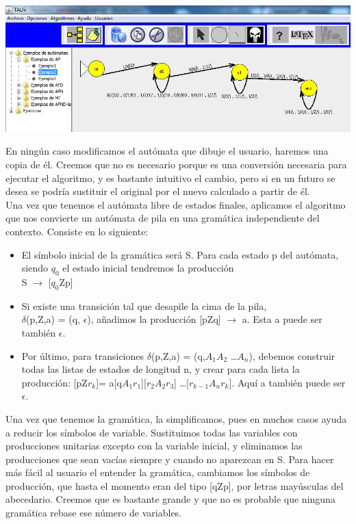 \documentclass[12pt,a4paper,spanish]{book}
\begin{document}
\begin{center}
\includegraphics[width=\textwidth]{roci1.jpg}
\end{center}

En ning\'un caso modificamos el aut\'omata que dibuje el usuario, haremos una copia de \'el. Creemos que no es necesario porque es una conversi\'on necesaria para ejecutar el algoritmo, y es bastante intuitivo el cambio, pero si en un futuro se desea se podr\'ia sustituir el original por el nuevo calculado a partir de \'el.\\

Una vez que tenemos el aut\'omata libre de estados finales, aplicamos el algoritmo que nos convierte un aut\'omata de pila en una gram\'atica independiente del contexto. Consiste en lo siguiente:
\begin{itemize}
\item El s\'imbolo inicial de la gram\'atica ser\'a S. Para cada estado p del aut\'omata, siendo $q_{0}$ el estado inicial tendremos la producci\'on\\ S $\rightarrow$ [$q_{0}$Zp]
\item Si existe una transici\'on tal que desapile la cima de la pila,\\ $\delta$(p,Z,a) = (q, $\epsilon$),
a\~nadimos la producci\'on [pZq] $\rightarrow$ a. Esta a puede ser tambi\'en $\epsilon$.
\item Por \'ultimo, para transiciones $\delta$(p,Z,a) = (q,$A_{1}A_{2}$ \ldots $A_{n}$), debemos construir todas las listas de estados de longitud n, y crear para cada lista la producci\'on:
[pZ$r_{k}$]= a[q$A_{1}r_{1}$][$r_{2}A_{2}r_{3}$] \ldots [$r_{k-1}A_{n}r_{k}$]. Aqu\'i a tambi\'en puede ser $\epsilon$.
\end{itemize}
Una vez que tenemos la gram\'atica, la simplificamos, pues en muchos casos ayuda a reducir los s\'imbolos de variable. Sustituimos todas las variables con producciones unitarias excepto con la variable inicial, y eliminamos las producciones que sean vac\'ias siempre y cuando no aparezcan en S. Para hacer m\'as f\'acil al usuario el entender la gram\'atica, cambiamos los s\'imbolos de producci\'on, que hasta el momento eran del tipo [qZp], por letras may\'usculas del abecedario. Creemos que es bastante grande y que no es probable que ninguna gram\'atica rebase ese n\'umero de variables.
\end{document}
